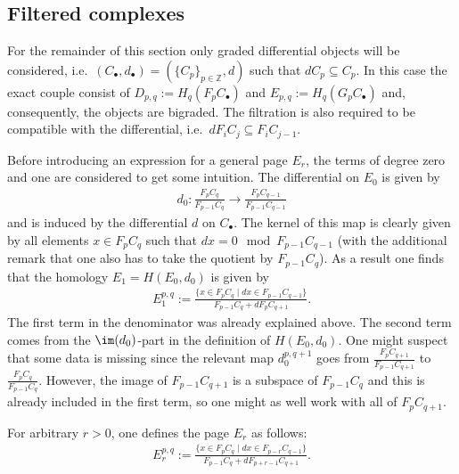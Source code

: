 \subsection{Filtered complexes}

	For the remainder of this section only graded differential objects will be considered, i.e.~$(C_\bullet,d_\bullet)=(\{C_p\}_{p\in\mathbb{Z}},d)$ such that $dC_p\subseteq C_p$. In this case the exact couple consist of $D_{p,q}:=H_q(F_pC_\bullet)$ and $E_{p,q}:=H_q(G_pC_\bullet)$ and, consequently, the objects are bigraded. The filtration is also required to be compatible with the differential, i.e.~$dF_iC_j\subseteq F_iC_{j-1}$.


	Before introducing an expression for a general page $E_r$, the terms of degree zero and one are considered to get some intuition. The differential on $E_0$ is given by
	\begin{gather}
		d_0:\frac{F_pC_q}{F_{p-1}C_q}\rightarrow\frac{F_pC_{q-1}}{F_{p-1}C_{q-1}}
	\end{gather}
	and is induced by the differential $d$ on $C_\bullet$. The kernel of this map is clearly given by all elements $x\in F_pC_q$ such that $dx = 0\mod F_{p-1}C_{q-1}$ (with the additional remark that one also has to take the quotient by $F_{p-1}C_q$). As a result one finds that the homology $E_1=H(E_0, d_0)$ is given by
	\begin{gather}
		E_1^{p,q}:=\frac{\{x\in F_pC_q\mid dx\in F_{p-1}C_{q-1}\}}{F_{p-1}C_q+dF_pC_{q+1}}.
	\end{gather}
	The first term in the denominator was already explained above. The second term comes from the $\im(d_0)$-part in the definition of $H(E_0,d_0)$. One might suspect that some data is missing since the relevant map $d_0^{p, q+1}$ goes from $\frac{F_pC_{q+1}}{F_{p-1}C_{q+1}}$ to $\frac{F_pC_q}{F_{p-1}C_{q}}$. However, the image of $F_{p-1}C_{q+1}$ is a subspace of $F_{p-1}C_q$ and this is already included in the first term, so one might as well work with all of $F_pC_{q+1}$.

	For arbitrary $r>0$, one defines the page $E_r$ as follows:
	\begin{gather}
    	E_r^{p,q}:=\frac{\{x\in F_pC_q\mid dx\in F_{p-r}C_{q-1}\}}{F_{p-1}C_q+dF_{p+r-1}C_{q+1}}.
	\end{gather}

